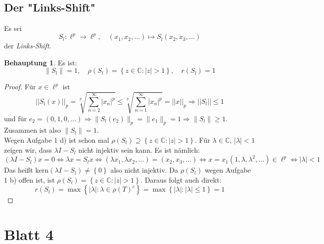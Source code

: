 \documentclass[ngerman]{article}
\theoremstyle{definition}%
\newtheorem*{beh}{Behauptung}
\newcommand{\C}{\mathbb{C}}
\newcommand{\abs}[1]{\left\lvert #1 \right\rvert }
\newcommand{\norm}[1]{\left\lvert \left\lvert #1 \right\rvert \right\rvert}
\newcommand{\df}{\Rightarrow} %
\newcommand{\afs}{"{}}
\renewcommand{\{ }{\left\lbrace}
\renewcommand{\}}{\right\rbrace}
\begin{document}
\subsection{Der \afs Links-Shift\afs}
	Es sei 
	$$S_l : \ell^p \to \ell^p,\quad (x_1,x_2,\dots)\mapsto S_l(x_2,x_3,\dots)$$
	der \textit{Links-Shift}.
	\begin{beh}
		Es ist: 
		$$\|S_l\| = 1,\quad \rho(S_l) = \{z\in\C : |z| > 1\} ,\quad r(S_l) = 1$$
	\end{beh}
	\begin{proof}
		Für $x\in \ell^p $ ist
		$$\norm{S_l(x)}_p = \sqrt[p]{\sum^\infty_{n=2} \abs{x_n}^p} \leq \sqrt[p]{\sum^\infty_{n=1} \abs{x_n}^p } = \norm{x}_p \df \norm{S_l} \leq 1$$
		und für $e_2= (0,1,0,\dots) \df \|S_l(e_2)\|_p = \| e_1 \|_p = 1 \df \|S_l\| \geq 1$. 	Zusammen ist also $\|S_l\| = 1$.\\
		Wegen Aufgabe 1 d) ist schon mal $\rho(S_l) \supseteq \{z\in\C:\abs{z}>1\}$. Für $\lambda\in \C,\,|\lambda|<1$ zeigen wir, dass $\lambda I - S_l$ nicht injektiv sein kann. Es ist nämlich:
		$$(\lambda I - S_l)x = 0 \Leftrightarrow \lambda x = S_lx \Leftrightarrow (\lambda x_1, \lambda x_2, \dots ) = ( x_2, x_3  ,\dots) \Leftrightarrow x = x_1(1,\lambda,\lambda^2,\dots) \in \ell^p  \Leftrightarrow |\lambda| < 1 $$
		Das heißt kern$(\lambda I - S_l) \not = \{0\}$ also nicht injektiv. Da $\rho(S_l)$ wegen Aufgabe 1 b) offen ist, ist $\rho(S_l) =  \{z\in\C : |z| > 1\}$. Daraus folgt auch direkt:
		$$r(S_l) = \max \{ \abs{\lambda} : \lambda \in \rho(T)^c \} = \max \{ \abs{\lambda} : |\lambda| \leq 1 \} = 1$$
	\end{proof}
	

\newpage
\section{Blatt 4}
\end{document}
